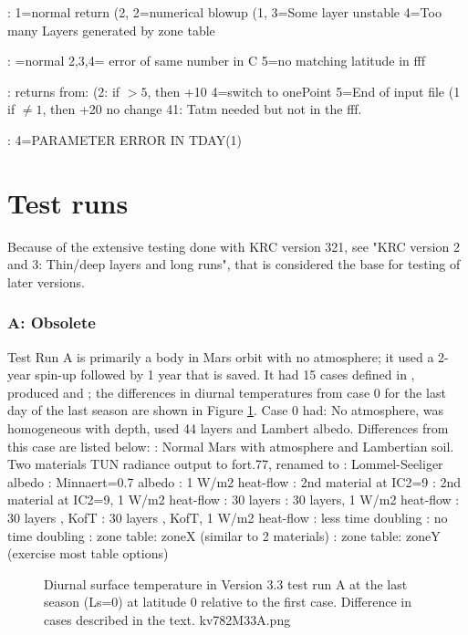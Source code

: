 \documentclass{article}
\begin{document}
:   1=normal return   (2, 2=numerical blowup 
\qi  {}(1,  3=Some layer unstable  4=Too many Layers generated by zone table

: 
=normal   2,3,4= error of same number in  
\qi  C  5=no matching latitude in fff

: returns from: 
\qi  {}(2: if $>5$, then +10   4=switch to onePoint  5=End of input file
\qi  {}(1   if $\ne 1$, then +20 
\qi  {}    no change
\qi  {}     41: Tatm needed but not in the fff.

: 
4=PARAMETER ERROR IN TDAY(1)
\section{Test runs  \label{t1} } 

Because of the extensive testing done with KRC version 321, see "KRC version 2
and 3: Thin/deep layers and long runs", that is considered the base for testing of
later versions.

\subsubsection{ A: Obsolete} %
Test Run A is primarily a body in Mars orbit with no atmosphere; it used a
2-year spin-up followed by 1 year that is saved. It had 15 cases defined in
, produced  and ; the differences in
diurnal temperatures from case 0 for the last day of the last season are shown
in Figure \ref{kv782M33A}.  Case 0 had: No atmosphere, was homogeneous with
depth, used 44 layers and Lambert albedo. Differences from this case are listed
below:
: Normal Mars with atmosphere and Lambertian soil. Two materials
\qii TUN radiance output to fort.77, renamed to 
: Lommel-Seeliger albedo
: Minnaert=0.7 albedo 
:  1 W/m2 heat-flow
:  2nd material at IC2=9 
:  2nd material at IC2=9,  1 W/m2 heat-flow
:  30 layers
:  30 layers, 1 W/m2 heat-flow
:  30 layers , KofT
: 30 layers , KofT, 1 W/m2 heat-flow
: less time doubling
: no time doubling
: zone table: zoneX (similar to 2 materials)
: zone table: zoneY (exercise most table options)

\begin{figure}[!ht] 
\caption[Test run A]{Diurnal surface temperature in Version 3.3 test run A at
  the last season (Ls=0) at latitude 0 relative to the first case. Difference in
  cases described in the text.
\label{kv782M33A} kv782M33A.png }
\end{figure} 
\end{document}
